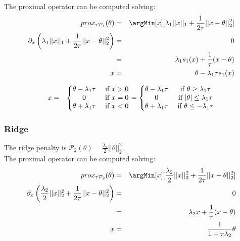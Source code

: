 \documentclass{article}
\begin{document}
The proximal operator can be computed solving:
\begin{eqnarray*}
prox_{\tau \mathcal{P}_1}(\theta) &=& \argMin[x][\lambda_1||x||_1+\frac{1}{2\tau} ||x-\theta||_2^2] \\
\partial_x\left(\lambda_1||x||_1+\frac{1}{2 \tau} ||x-\theta||_2^2 \right) 
       &=& 0 \\
       &=& \lambda_1 s_1(x)+\frac{1}{\tau} (x-\theta) \\
     x &=& \theta - \lambda_1 \tau s_1(x)	
\end{eqnarray*}
		
\begin{eqnarray}
x &=& \left\{ \begin{matrix}
\theta - \lambda_1 \tau &\text{ if } x>0  \\
0 & \text{ if } x=0  \\
\theta + \lambda_1 \tau &\text{ if } x<0  \\
\end{matrix}  \right. 
= \left\{ \begin{matrix}
\theta - \lambda_1 \tau &\text{ if } \theta\geq\lambda_1\tau  \\
0 & \text{ if } |\theta|\leq\lambda_1\tau  \\
\theta + \lambda_1 \tau &\text{ if } \theta\leq-\lambda_1\tau  \\
\end{matrix}  \right. \notag 
\end{eqnarray}
		
\boxResult{\[prox_{\tau \mathcal{P}_1}(\theta) = sign(\theta)(|\theta|-\lambda_1\tau)^+ \]}

\subsubsection{Ridge}
\label{sec:org6141ee3}
The ridge penalty is $\mathcal{P}_2(\theta)=\frac{\lambda_2}{2}||\theta||^2_2$. \\

The proximal operator can be computed solving:
\begin{eqnarray*}
prox_{\tau \mathcal{P}_2}(\theta) &=& \argMin[x][\frac{\lambda_2}{2}||x||^2_2+\frac{1}{2\tau} ||x-\theta||_2^2] \\
\partial_x\left(\frac{\lambda_2}{2}||x||^2_2+\frac{1}{2 \tau} ||x-\theta||_2^2 \right) 
       &=& 0 \\
       &=& \lambda_2 x+\frac{1}{\tau} (x-\theta) \\
     x &=& \frac{1}{1+\tau\lambda_2}\theta
\end{eqnarray*}
\end{document}
